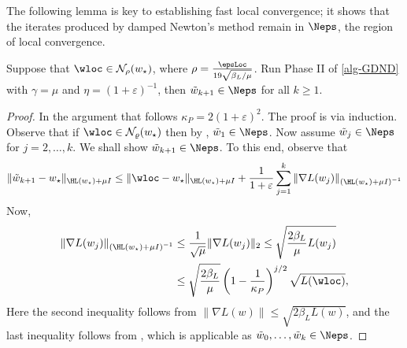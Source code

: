 The following lemma is key to establishing fast local convergence; it shows that the iterates produced by damped Newton's method remain in $\Neps$, the region of local convergence. 
\begin{lemma}
\label{lemma:trapped}
    Suppose that $\wloc \in \mathcal N_{\rho}(w_\star)$, where $\rho = \frac{\epsLoc}{19\sqrt{\beta_L/\mu}}$.
    Run Phase II of \cref{alg-GDND} with $\gamma = \mu$ and $\eta = (1+\varepsilon)^{-1}$, then $\tilde w_{k+1} \in \Neps$ for all $k\geq 1$.
\end{lemma}
\begin{proof}
  In the argument that follows $\kappa_P = 2(1+\varepsilon)^2$.
  The proof is via induction. 
  Observe that if $\wloc \in \mathcal N_{\varrho}(w_\star)$ then by , $\tilde w_1 \in \Neps$.  
  Now assume $\tilde w_j \in \Neps$ for $j = 2,\dots, k$. 
  We shall show $\tilde w_{k+1}\in \Neps$.
  To this end, observe that
  \begin{align*}
  \|\tilde w_{k+1}-w_\star\|_{\HL(w_\star)+\mu I} & \leq \|\wloc-w_\star\|_{\HL(w_\star)+\mu I}+\frac{1}{1+\varepsilon}\sum_{j=1}^{k}\|\nabla L(w_j)\|_{\left(\HL(w_\star)+\mu I\right)^{-1}} \\
  \end{align*}
  Now,
  \begin{align*}
      \|\nabla L(w_j)\|_{\left(\HL(w_\star)+\mu I\right)^{-1}} &\leq \frac{1}{\sqrt{\mu}}\|\nabla L(w_j)\|_2 \leq \sqrt{\frac{2\beta_L}{\mu}L(w_j) }\\
      &\leq \sqrt{\frac{2\beta_L}{\mu}}\left(1-\frac{1}{\kappa_P}\right)^{j/2}\sqrt{L(\wloc)},
  \end{align*}
  Here the second inequality follows from $\|\nabla L(w)\| \leq \sqrt{2\beta_L L(w)}$, and the last inequality follows from , which is applicable as $\tilde w_{0},\dots,\tilde w_k \in \Neps$. 

\end{proof}

